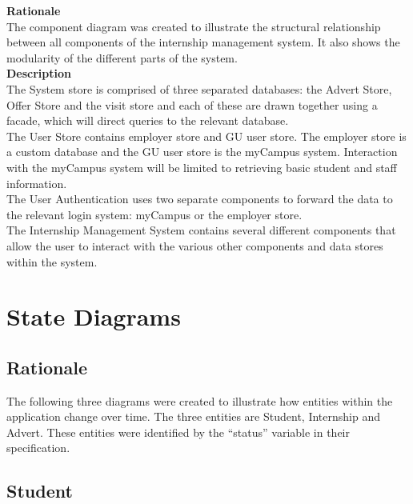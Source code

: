 \documentclass{l3deliverable}
\begin{document}
\textbf{Rationale}\\
The component diagram was created to illustrate the structural relationship between all components of the internship management system. It also shows the modularity of the different parts of the system.\\

\textbf{Description}\\

The System store is comprised of three separated databases: the Advert Store, Offer Store and the visit store and each of these are drawn together using a facade, which will direct queries to the relevant database. \\

The User Store contains employer store and GU user store. The employer store is a custom database and the GU user store is the myCampus system. Interaction with the myCampus system will be limited to retrieving basic student and staff information.\\

The User Authentication uses two separate components to forward the data to the relevant login system: myCampus or the employer store. \\

The Internship Management System contains several different components that allow the user to interact with the various other components and data stores within the system.\\



\section{State Diagrams}

\subsection{Rationale}

The following three diagrams were created to illustrate how entities within the application change over time. The three entities are Student, Internship and Advert. These entities were identified by the ``status'' variable in their specification. \\

\subsection{Student}
\end{document}
